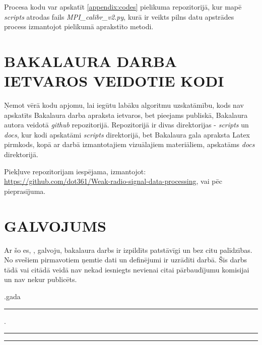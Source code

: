 \documentclass[12pt,paper=a4]{report}
\newcounter{nofappendices}
\begin{document}
Procesa kodu var apskatīt \ref{appendix:codes} pielikuma repozitorijā, kur mapē \textit{scripts} atrodas fails \textit{MPI\_calibr\_v2.py}, kurā ir veikts pilns datu apstrādes process izmantojot pielikumā aprakstīto metodi.


\begin{figure}[h!]
  \centering
  \begin{turn}{-90}
  \begin{minipage}{\textheight}
  
  \end{minipage}
  \end{turn}
\end{figure}




\addtocounter{nofappendices}{1}
\label{appendix:new-version}
%


\chapter{BAKALAURA DARBA IETVAROS VEIDOTIE KODI}

Ņemot vērā kodu apjomu, lai iegūtu labāku algoritmu uzskatāmību, kods nav apskatīts Bakalaura darba apraksta ietvaros, bet pieejams publiskā, Bakalaura autora veidotā \textit{github} repozitorijā. Repozitorijā ir divas direktorijas - \textit{scripts} un \textit{docs}, kur kodi apskatāmi \textit{scripts} direktorijā, bet Bakalaura gala apraksta Latex pirmkods, kopā ar darbā izmantotajiem vizuālajiem materiāliem, apskatāms \textit{docs} direktorijā.

Piekļuve repozitorijam iespējama, izmantojot: \\
\url{https://github.com/dot361/Weak-radio-signal-data-processing}, vai pēc pieprasījuma.


\addtocounter{nofappendices}{1}
\label{appendix:codes}

\chapter*{GALVOJUMS}
 Ar šo es, , galvoju, bakalaura darbs ir izpildīts patstāvīgi un bez citu palīdzības. No svešiem pirmavotiem ņemtie dati un definējumi ir uzrādīti darbā. Šis darbs tādā vai citādā veidā nav nekad iesniegts nevienai citai pārbaudījumu komisijai un nav nekur publicēts.

\vspace{2cm}
.gada \rule{1cm}{0.2pt}.\rule{3cm}{0.2pt}
\hspace{100pt} \rule{4cm}{0.2pt}
\vspace{2cm} 
\end{document}
